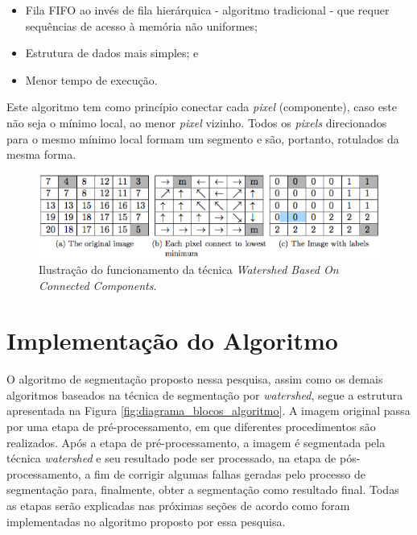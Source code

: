 \begin{itemize}
    \item Fila FIFO ao invés de fila hierárquica - algoritmo tradicional - que requer sequências de acesso à memória não uniformes;
    \item Estrutura de dados mais simples; e
    \item Menor tempo de execução.
\end{itemize}    

Este algoritmo tem como princípio conectar cada \textit{pixel} (componente), caso este não seja o mínimo local, ao menor \textit{pixel} vizinho. Todos os \textit{pixels} direcionados para o mesmo mínimo local formam um segmento e são, portanto, rotulados da mesma forma.

	\begin{figure}[!htb]
       \begin{center}  
          \includegraphics[width=0.8\columnwidth]{img/connected_components.jpg}
           \caption{\label{fig:connected_components}Ilustração do funcionamento da técnica \textit{Watershed Based On Connected Components}.\cite{ruparelia2012implementation}}
       \end{center}
   \end{figure}

\section{Implementação do Algoritmo}\label{sec:alg}

O algoritmo de segmentação proposto nessa pesquisa, assim como os demais algoritmos baseados na técnica de segmentação por \textit{watershed}, segue a estrutura apresentada na Figura \ref{fig:diagrama_blocos_algoritmo}. A imagem original passa por uma etapa de pré-processamento, em que diferentes procedimentos são realizados. Após a etapa de pré-processamento, a imagem é segmentada pela técnica \textit{watershed} e seu resultado pode ser processado, na etapa de pós-processamento, a fim de corrigir algumas falhas geradas pelo processo de segmentação para, finalmente, obter a segmentação como resultado final.
Todas as etapas serão explicadas nas próximas seções de acordo como foram implementadas no algoritmo proposto por essa pesquisa.

